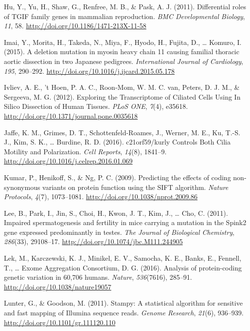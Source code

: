 \documentclass[12pt,twoside]{reedthesis}
\theoremstyle{definition}
\theoremstyle{definition}
\theoremstyle{remark}
\begin{document}
  \hypertarget{ref-Hu2011}{}
  Hu, Y., Yu, H., Shaw, G., Renfree, M. B., \& Pask, A. J. (2011).
  Differential roles of TGIF family genes in mammalian reproduction.
  \emph{BMC Developmental Biology}, \emph{11}, 58.
  \url{http://doi.org/10.1186/1471-213X-11-58}
  
  \hypertarget{ref-Imai2015}{}
  Imai, Y., Morita, H., Takeda, N., Miya, F., Hyodo, H., Fujita, D.,
  \ldots{} Komuro, I. (2015). A deletion mutation in myosin heavy chain 11
  causing familial thoracic aortic dissection in two Japanese pedigrees.
  \emph{International Journal of Cardiology}, \emph{195}, 290--292.
  \url{http://doi.org/10.1016/j.ijcard.2015.05.178}
  
  \hypertarget{ref-Ivliev2012}{}
  Ivliev, A. E., 't Hoen, P. A. C., Roon-Mom, W. M. C. van, Peters, D. J.
  M., \& Sergeeva, M. G. (2012). Exploring the Transcriptome of Ciliated
  Cells Using In Silico Dissection of Human Tissues. \emph{PLoS ONE},
  \emph{7}(4), e35618. \url{http://doi.org/10.1371/journal.pone.0035618}
  
  \hypertarget{ref-Jaffe2016}{}
  Jaffe, K. M., Grimes, D. T., Schottenfeld-Roames, J., Werner, M. E., Ku,
  T.-S. J., Kim, S. K., \ldots{} Burdine, R. D. (2016). c21orf59/kurly
  Controls Both Cilia Motility and Polarization. \emph{Cell Reports},
  \emph{14}(8), 1841--9. \url{http://doi.org/10.1016/j.celrep.2016.01.069}
  
  \hypertarget{ref-Kumar2009}{}
  Kumar, P., Henikoff, S., \& Ng, P. C. (2009). Predicting the effects of
  coding non-synonymous variants on protein function using the SIFT
  algorithm. \emph{Nature Protocols}, \emph{4}(7), 1073--1081.
  \url{http://doi.org/10.1038/nprot.2009.86}
  
  \hypertarget{ref-Lee2011}{}
  Lee, B., Park, I., Jin, S., Choi, H., Kwon, J. T., Kim, J., \ldots{}
  Cho, C. (2011). Impaired spermatogenesis and fertility in mice carrying
  a mutation in the Spink2 gene expressed predominantly in testes.
  \emph{The Journal of Biological Chemistry}, \emph{286}(33), 29108--17.
  \url{http://doi.org/10.1074/jbc.M111.244905}
  
  \hypertarget{ref-Lek2016}{}
  Lek, M., Karczewski, K. J., Minikel, E. V., Samocha, K. E., Banks, E.,
  Fennell, T., \ldots{} Exome Aggregation Consortium, D. G. (2016).
  Analysis of protein-coding genetic variation in 60,706 humans.
  \emph{Nature}, \emph{536}(7616), 285--91.
  \url{http://doi.org/10.1038/nature19057}
  
  \hypertarget{ref-Lunter2011}{}
  Lunter, G., \& Goodson, M. (2011). Stampy: A statistical algorithm for
  sensitive and fast mapping of Illumina sequence reads. \emph{Genome
  Research}, \emph{21}(6), 936--939.
  \url{http://doi.org/10.1101/gr.111120.110}
  
\end{document}
